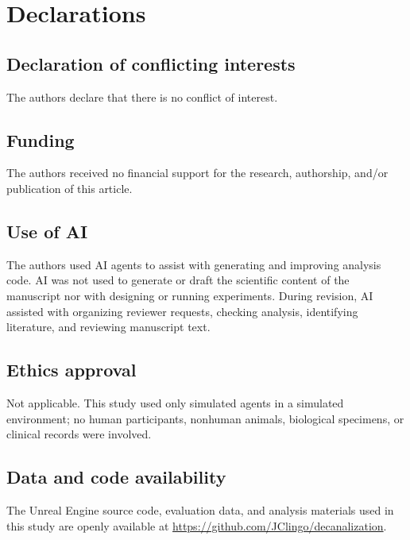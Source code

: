 \documentclass[12pt,fleqn]{article}
\begin{document}
\section*{Declarations}

\subsection*{Declaration of conflicting interests}
The authors declare that there is no conflict of interest.

\subsection*{Funding}
\begin{sloppypar}
  The authors received no financial support for the research, authorship, and/or publication of this article.
\end{sloppypar}

\subsection*{Use of AI}

The authors used AI agents to assist with generating and improving analysis code. AI was not used to generate or draft the scientific content of the manuscript nor with designing or running experiments. During revision, AI assisted with organizing reviewer requests, checking analysis, identifying literature, and reviewing manuscript text.

\subsection*{Ethics approval}
Not applicable. This study used only simulated agents in a simulated environment; no human participants, nonhuman animals, biological specimens, or clinical records were involved.

\subsection*{Data and code availability}
The Unreal Engine source code, evaluation data, and analysis materials used in this study are openly available at \url{https://github.com/JClingo/decanalization}.
\end{document}
